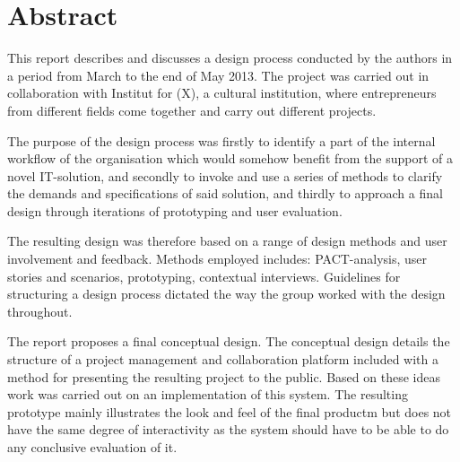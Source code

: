 \chapter{Abstract}
This report describes and discusses a design process conducted by the authors in a period from March to the end of May 2013. The project was carried out in collaboration with Institut for (X), a cultural institution, where entrepreneurs from different fields come together and carry out different projects. 

The purpose of the design process was firstly to identify a part of the internal workflow of the organisation which would somehow benefit from the support of a novel IT-solution, and secondly to invoke and use a series of methods to clarify the demands and specifications of said solution, and thirdly to approach a final design through iterations of prototyping and user evaluation. 

The resulting design was therefore based on a range of design methods and user involvement and feedback. Methods employed includes: PACT-analysis, user stories and scenarios, prototyping, contextual interviews. Guidelines for structuring a design process dictated the way the group worked with the design throughout. 

The report proposes a final conceptual design. The conceptual design details the structure of a project management and collaboration platform included with a method for presenting the resulting project to the public. Based on these ideas work was carried out on an implementation of this system. The resulting prototype mainly illustrates the look and feel of the final productm but does not have the same degree of interactivity as the system should have to be able to do any conclusive evaluation of it.
